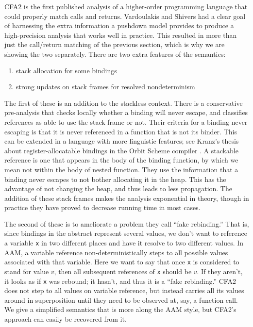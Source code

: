\documentclass{llncs}
\begin{document}
CFA2 is the first published analysis of a higher-order programming
language that could properly match calls and returns. Vardoulakis and
Shivers had a clear goal of harnessing the extra information a
pushdown model provides to produce a high-precision analysis that
works well in practice. This resulted in more than just the
call/return matching of the previous section, which is why we are
showing the two separately. There are two extra features of the
semantics:
\begin{enumerate}
\item{stack allocation for some bindings}
\item{strong updates on stack frames for resolved nondeterminism}
\end{enumerate}
The first of these is an addition to the stackless context. There is a
conservative pre-analysis that checks locally whether a binding will
never escape, and classifies references as able to use the stack frame
or not. Their criteria for a binding never escaping is that it is
never referenced in a function that is not its binder. This can be
extended in a language with more linguistic features; see Kranz's
thesis about register-allocatable bindings in the Orbit Scheme
compiler \citep{ianjohnson:kranz:thesis:1988}. A stackable reference
is one that appears in the body of the binding function, by which we
mean not within the body of nested function. They use the information
that a binding never escapes to not bother allocating it in the
heap. This has the advantage of not changing the heap, and thus leads
to less propagation. The addition of these stack frames makes the
analysis exponential in theory, though in practice they have proved to
decrease running time in most cases.

The second of these is to ameliorate a problem they call ``fake
rebinding.'' That is, since bindings in the abstract represent several
values, we don't want to reference a variable \texttt{x} in two
different places and have it resolve to two different values. In AAM,
a variable reference non-deterministically steps to all possible
values associated with that variable. Here we want to say that once
\texttt{x} is considered to stand for value $v$, then all subsequent
references of \texttt{x} should be $v$. If they aren't, it looks as if
\texttt{x} was rebound; it hasn't, and thus it is a ``fake
rebinding.'' CFA2 does not step to all values on variable reference,
but instead carries all its values around in superposition until they
need to be observed at, say, a function call. We give a simplified
semantics that is more along the AAM style, but CFA2's approach can
easily be recovered from it.
\end{document}
